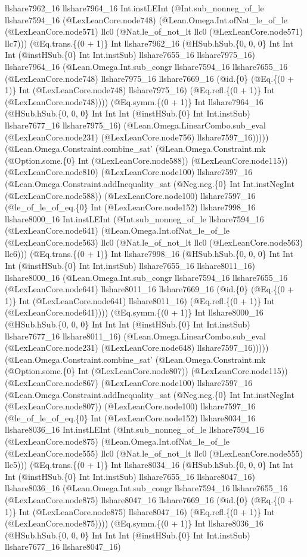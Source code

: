 \documentclass[11pt]{article}
\begin{document}
llshare7962\_16 llshare7964\_16 Int.instLEInt (@Int.sub\_nonneg\_of\_le llshare7594\_16 (@LexLeanCore.node748) (@Lean.Omega.Int.ofNat\_le\_of\_le (@LexLeanCore.node571) llc0 (@Nat.le\_of\_not\_lt llc0 (@LexLeanCore.node571) llc7))) (@Eq.trans.\{(0 + 1)\} Int llshare7962\_16 (@HSub.hSub.\{0, 0, 0\} Int Int Int (@instHSub.\{0\} Int Int.instSub) llshare7655\_16 llshare7975\_16) llshare7964\_16 (@Lean.Omega.Int.sub\_congr llshare7594\_16 llshare7655\_16 (@LexLeanCore.node748) llshare7975\_16 llshare7669\_16 (@id.\{0\} (@Eq.\{(0 + 1)\} Int (@LexLeanCore.node748) llshare7975\_16) (@Eq.refl.\{(0 + 1)\} Int (@LexLeanCore.node748)))) (@Eq.symm.\{(0 + 1)\} Int llshare7964\_16 (@HSub.hSub.\{0, 0, 0\} Int Int Int (@instHSub.\{0\} Int Int.instSub) llshare7677\_16 llshare7975\_16) (@Lean.Omega.LinearCombo.sub\_eval (@LexLeanCore.node231) (@LexLeanCore.node756) llshare7597\_16))))) (@Lean.Omega.Constraint.combine\_sat' (@Lean.Omega.Constraint.mk (@Option.some.\{0\} Int (@LexLeanCore.node588)) (@LexLeanCore.node115)) (@LexLeanCore.node810) (@LexLeanCore.node100) llshare7597\_16 (@Lean.Omega.Constraint.addInequality\_sat (@Neg.neg.\{0\} Int Int.instNegInt (@LexLeanCore.node588)) (@LexLeanCore.node100) llshare7597\_16 (@le\_of\_le\_of\_eq.\{0\} Int (@LexLeanCore.node152) llshare7998\_16 llshare8000\_16 Int.instLEInt (@Int.sub\_nonneg\_of\_le llshare7594\_16 (@LexLeanCore.node641) (@Lean.Omega.Int.ofNat\_le\_of\_le (@LexLeanCore.node563) llc0 (@Nat.le\_of\_not\_lt llc0 (@LexLeanCore.node563) llc6))) (@Eq.trans.\{(0 + 1)\} Int llshare7998\_16 (@HSub.hSub.\{0, 0, 0\} Int Int Int (@instHSub.\{0\} Int Int.instSub) llshare7655\_16 llshare8011\_16) llshare8000\_16 (@Lean.Omega.Int.sub\_congr llshare7594\_16 llshare7655\_16 (@LexLeanCore.node641) llshare8011\_16 llshare7669\_16 (@id.\{0\} (@Eq.\{(0 + 1)\} Int (@LexLeanCore.node641) llshare8011\_16) (@Eq.refl.\{(0 + 1)\} Int (@LexLeanCore.node641)))) (@Eq.symm.\{(0 + 1)\} Int llshare8000\_16 (@HSub.hSub.\{0, 0, 0\} Int Int Int (@instHSub.\{0\} Int Int.instSub) llshare7677\_16 llshare8011\_16) (@Lean.Omega.LinearCombo.sub\_eval (@LexLeanCore.node231) (@LexLeanCore.node648) llshare7597\_16))))) (@Lean.Omega.Constraint.combine\_sat' (@Lean.Omega.Constraint.mk (@Option.some.\{0\} Int (@LexLeanCore.node807)) (@LexLeanCore.node115)) (@LexLeanCore.node867) (@LexLeanCore.node100) llshare7597\_16 (@Lean.Omega.Constraint.addInequality\_sat (@Neg.neg.\{0\} Int Int.instNegInt (@LexLeanCore.node807)) (@LexLeanCore.node100) llshare7597\_16 (@le\_of\_le\_of\_eq.\{0\} Int (@LexLeanCore.node152) llshare8034\_16 llshare8036\_16 Int.instLEInt (@Int.sub\_nonneg\_of\_le llshare7594\_16 (@LexLeanCore.node875) (@Lean.Omega.Int.ofNat\_le\_of\_le (@LexLeanCore.node555) llc0 (@Nat.le\_of\_not\_lt llc0 (@LexLeanCore.node555) llc5))) (@Eq.trans.\{(0 + 1)\} Int llshare8034\_16 (@HSub.hSub.\{0, 0, 0\} Int Int Int (@instHSub.\{0\} Int Int.instSub) llshare7655\_16 llshare8047\_16) llshare8036\_16 (@Lean.Omega.Int.sub\_congr llshare7594\_16 llshare7655\_16 (@LexLeanCore.node875) llshare8047\_16 llshare7669\_16 (@id.\{0\} (@Eq.\{(0 + 1)\} Int (@LexLeanCore.node875) llshare8047\_16) (@Eq.refl.\{(0 + 1)\} Int (@LexLeanCore.node875)))) (@Eq.symm.\{(0 + 1)\} Int llshare8036\_16 (@HSub.hSub.\{0, 0, 0\} Int Int Int (@instHSub.\{0\} Int Int.instSub) llshare7677\_16 llshare8047\_16) 
\end{document}
